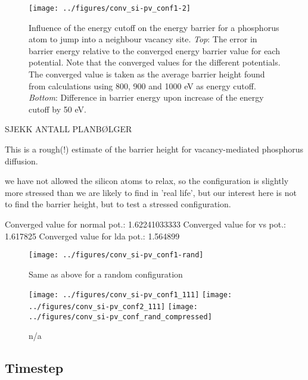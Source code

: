 \documentclass[11pt,bibliography=totoc,index=totoc]{scrbook}   %
\begin{document}
\begin{figure}[htbp]
  \begin{center}
    \texttt{[image: ../figures/conv\_si-pv\_conf1-2]}
  \end{center}
  \caption{Influence of the energy cutoff on the energy barrier for a phosphorus atom to jump into a neighbour vacancy site. 
  \textit{Top}: The error in barrier energy relative to the converged energy barrier value for each potential. 
  Note that the converged values for the different potentials.
  The converged value is taken as the average barrier height found from calculations using 800, 900 and 1000 eV as energy cutoff.
  \textit{Bottom}: Difference in barrier energy upon increase of the energy cutoff by 50 eV.}
  \label{fig:figs/conv_si-pv_conf1-2}
\end{figure}


SJEKK ANTALL PLANBØLGER

This is a rough(!) estimate of the barrier height for vacancy-mediated phosphorus diffusion.

we have not allowed the silicon atoms to relax, so the configuration is slightly more stressed than 
we are likely to find in 'real life', but our interest here is not to find the barrier height, but 
to test a stressed configuration.

Converged value for normal pot.: 1.62241033333
Converged value for vs pot.: 1.617825
Converged value for lda pot.: 1.564899


\begin{figure}[htbp]
  \begin{center}
    \texttt{[image: ../figures/conv\_si-pv\_conf1-rand]}
  \end{center}
  \caption{Same as above for a random configuration}
  \label{fig:figs/conv_si-pv_conf1-rand}
\end{figure}


\begin{figure}[htbp]
  \begin{center}
    \texttt{[image: ../figures/conv\_si-pv\_conf1\_111]}
    \texttt{[image: ../figures/conv\_si-pv\_conf2\_111]}
    \texttt{[image: ../figures/conv\_si-pv\_conf\_rand\_compressed]}
  \end{center}
  \caption{n/a}
  \label{fig:figs/conv_si-pv_conf}
\end{figure}




\subsection{Timestep}
\end{document}
